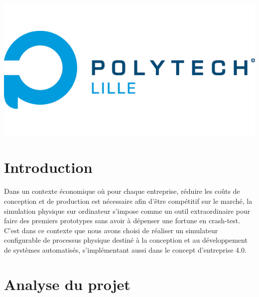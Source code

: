 \documentclass[12pt]{article}
\begin{document}
\begin{titlepage}

\includegraphics[scale=0.4]{logo.png} %
 
 
\vfill %


\end{titlepage}
\clearpage \vspace*{\fill} \begin{center} \begin{minipage}{\textwidth} \centering{\tableofcontents} \end{minipage} \end{center} \vfill %
\newpage
{}
\section*{Introduction}
Dans un contexte économique où pour chaque entreprise, réduire les coûts de conception et de production est nécessaire afin d’être compétitif sur le marché, la simulation physique sur ordinateur s’impose comme un outil extraordinaire pour faire des premiers prototypes sans avoir à dépenser une fortune en crash-test. C’est dans ce contexte que nous avons choisi de réaliser un simulateur configurable de processus physique destiné à la conception et au développement de systèmes automatisés, s’implémentant aussi dans le concept d’entreprise 4.0.

\section{Analyse du projet}
\end{document}
